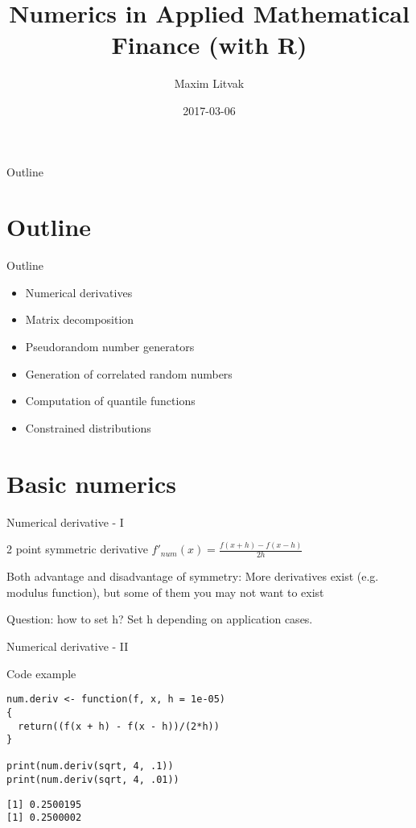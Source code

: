 \documentclass[presentation]{beamer}
\author{Maxim Litvak}
\date{2017-03-06}
\title{Numerics in Applied Mathematical Finance (with R)}
\begin{document}
\maketitle
\begin{frame}{Outline}
\tableofcontents
\end{frame}

\section{Outline}
\label{sec-1}
\begin{frame}[label=sec-1-1]{Outline}
\begin{itemize}
\item Numerical derivatives
\item Matrix decomposition
\item Pseudorandom number generators
\item Generation of correlated random numbers
\item Computation of quantile functions
\item Constrained distributions
\end{itemize}
\end{frame}
\section{Basic numerics}
\label{sec-2}
\begin{frame}[label=sec-2-1]{Numerical derivative - I}
\begin{block}{2 point symmetric derivative}
$f'_{num}(x) = \frac{f(x + h) - f(x - h)}{2h}$
\end{block}
\begin{block}{Both advantage and disadvantage of symmetry:}
More derivatives exist (e.g. modulus function), but some of them you may not want to exist
\end{block}
\begin{block}{Question: how to set h?}
Set h depending on application cases. 
\end{block}
\end{frame}
\begin{frame}[fragile,label=sec-2-2]{Numerical derivative - II}
 \begin{block}{Code example}
\begin{verbatim}
num.deriv <- function(f, x, h = 1e-05)
{
  return((f(x + h) - f(x - h))/(2*h))
}

print(num.deriv(sqrt, 4, .1))
print(num.deriv(sqrt, 4, .01))
\end{verbatim}

\begin{verbatim}
[1] 0.2500195
[1] 0.2500002
\end{verbatim}
\end{block}
\end{frame}
\end{document}
